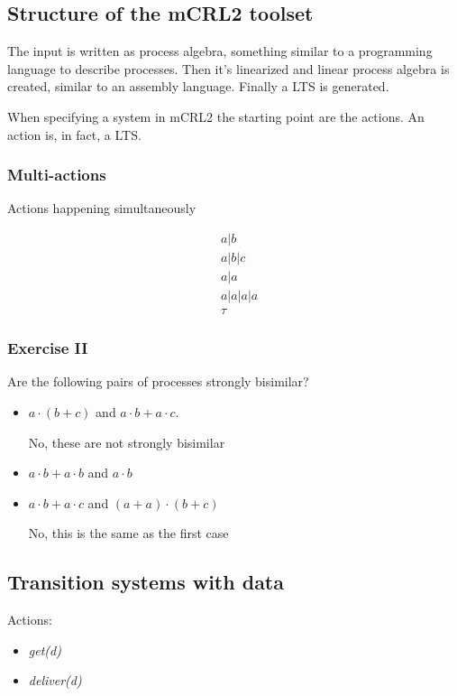 \subsection{Structure of the mCRL2 toolset}
The input is written as process algebra, something similar to a programming language to 
describe processes. Then it's linearized and linear process algebra is created, similar to an
assembly language. Finally a LTS is generated.

When specifying a system in mCRL2 the starting point are the actions. An action is, in fact, a 
LTS.

\subsubsection{Multi-actions}

Actions happening simultaneously

\begin{align*}
  & a | b \\
  & a | b | c \\
  & a | a \\
  & a | a | a |a  \\
  & \tau
\end{align*}

\subsubsection{Exercise II}

Are the following pairs of processes strongly bisimilar?

\begin{itemize}
  \item $a \cdot (b + c)$ and $a \cdot b + a \cdot c$. 

  No, these are not strongly bisimilar
  \item $a \cdot b + a \cdot b$ and $a \cdot b$
  \item $a \cdot b + a \cdot c$ and $(a + a) \cdot (b + c)$

  No, this is the same as the first case

\end{itemize}

\subsection{Transition systems with data}

Actions:
\begin{itemize}
  \item \emph{get(d)}
  \item \emph{deliver(d)}
\end{itemize}

